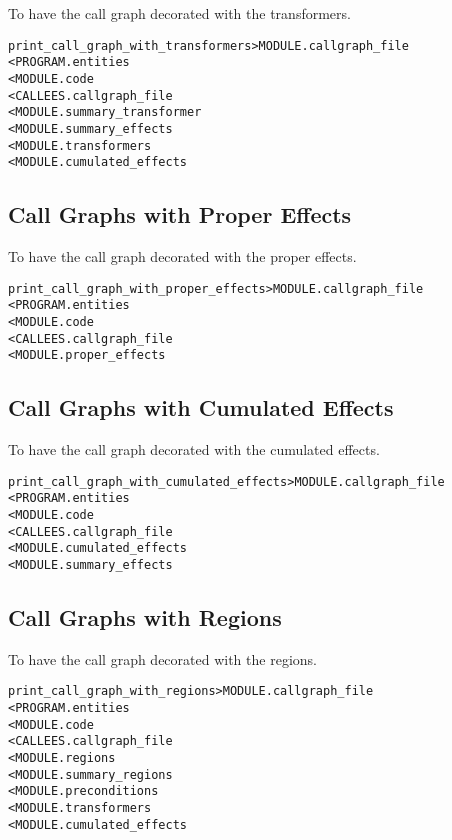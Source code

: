 \documentclass[a4paper]{report}
\newenvironment{PipsMake}{\begin{alltt}}{\end{alltt}}
\newenvironment{PipsPass}[1]{\label{pass:#1}}{}
\begin{document}
\begin{PipsPass}{print_call_graph_with_transformers}
To have the call graph decorated with the transformers.
\end{PipsPass}
\begin{PipsMake}
print_call_graph_with_transformers       > MODULE.callgraph_file
        < PROGRAM.entities
        < MODULE.code
        < CALLEES.callgraph_file
        < MODULE.summary_transformer
        < MODULE.summary_effects
        < MODULE.transformers
        < MODULE.cumulated_effects
\end{PipsMake}

\subsection{Call Graphs with Proper Effects}

\begin{PipsPass}{print_call_graph_with_proper_effects}
To have the call graph decorated with the proper effects.
\end{PipsPass}
\begin{PipsMake}
print_call_graph_with_proper_effects     > MODULE.callgraph_file
        < PROGRAM.entities
        < MODULE.code
        < CALLEES.callgraph_file
        < MODULE.proper_effects
\end{PipsMake}

\subsection{Call Graphs with Cumulated Effects}

\begin{PipsPass}{print_call_graph_with_cumulated_effects}
To have the call graph decorated with the cumulated effects.
\end{PipsPass}
\begin{PipsMake}
print_call_graph_with_cumulated_effects  > MODULE.callgraph_file
        < PROGRAM.entities
        < MODULE.code
        < CALLEES.callgraph_file
        < MODULE.cumulated_effects
        < MODULE.summary_effects
\end{PipsMake}

\subsection{Call Graphs with Regions}

\begin{PipsPass}{print_call_graph_with_regions}
To have the call graph decorated with the regions.
\end{PipsPass}
\begin{PipsMake}
print_call_graph_with_regions            > MODULE.callgraph_file
        < PROGRAM.entities
        < MODULE.code
        < CALLEES.callgraph_file
        < MODULE.regions
        < MODULE.summary_regions
        < MODULE.preconditions
        < MODULE.transformers
        < MODULE.cumulated_effects
\end{PipsMake}
\end{document}
